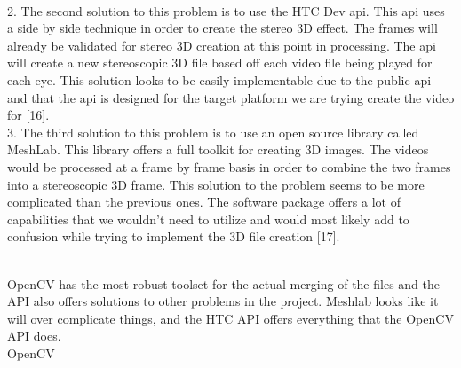 \documentclass[10pt,draftclsnofoot,onecolumn]{IEEEtran}
\newcommand\tab[1][1cm]{\hspace*{#1}}
\begin{document}
\\
\tab \tab \tab 2. The second solution to this problem is to use the HTC Dev api. This api uses \newline \tab \tab \tab a side by side technique in order to create the stereo 3D effect. The frames will already be \tab \tab \tab validated for stereo 3D creation at this point in processing. The api will create a \newline \tab \tab \tab new stereoscopic 3D file based off each video file being played for each eye. This solution \tab \tab \tab looks to be easily implementable due to the public api and that the api is designed for the \tab \tab \tab target platform we are trying create the video for [16].
 \\
\tab \tab \tab 3.  The third solution to this problem is to use an open source library called MeshLab. This \tab \tab \tab library offers a full toolkit for creating 3D images. The videos would be processed at a frame \tab \tab \tab by frame basis in order to combine the two frames into a stereoscopic 3D frame. This \newline \tab \tab \tab solution to the problem seems to be more complicated than the previous ones. The software \tab \tab \tab package offers a lot of capabilities that we wouldn’t need to utilize and would most likely add \tab \tab \tab to confusion while trying to implement the 3D file creation [17].


\\
\tab \tab {\Medium\textbf{e. Discussion:  }}OpenCV has the most robust toolset for the actual merging of the files and the API \tab \tab \tab also offers solutions to other problems in the project. Meshlab looks like it will over \newline \tab \tab \tab complicate things, and the HTC API offers everything that the OpenCV API does.\\
\tab \tab {\Medium\textbf{f. Best Option:   }} OpenCV\\
\vspace{5mm}
\end{document}

